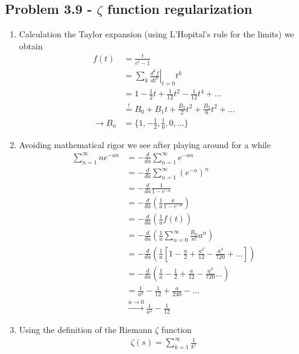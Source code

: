 \documentclass[../main.tex]{subfiles}
\begin{document}
\subsection{Problem 3.9 - \texorpdfstring{$\zeta$}{TEXT} function regularization}
\begin{enumerate}
    \item Calculation the Taylor expansion (using L'Hopital's rule for the limits) we obtain
    \begin{align}
        f(t)
        &=\frac{t}{e^t-1}\\
        &=\sum_k\left.\frac{d^kf}{dt^k}\right|_{t=0}t^k\\
        &=1-\frac{1}{2}t+\frac{1}{12}t^2-\frac{1}{12}t^4+...\\
        &\stackrel{!}{=}B_0+B_1t+\frac{B_2}{2}t^2+\frac{B_3}{6}t^2+...\\
        \rightarrow B_n&=\{1,-\frac{1}{2},\frac{1}{6},0,...\}
    \end{align}
    \item Avoiding mathematical rigor we see after playing around for a while
    \begin{align}
        \sum_{n=1}^\infty ne^{-an}
        &=-\frac{d}{da}\sum_{n=1}^\infty e^{-an}\\
        &=-\frac{d}{da}\sum_{n=1}^\infty \left(e^{-a}\right)^n\\
        &=-\frac{d}{da}\frac{1}{1-e^{-a}}\\
        &=-\frac{d}{da}\left(\frac{1}{a}\frac{a}{1-e^{-a}}\right)\\
        &=-\frac{d}{da}\left(\frac{1}{a}f(t)\right)\\
        &=-\frac{d}{da}\left(\frac{1}{a}\sum_{n=0}^\infty\frac{B_n}{n!}a^n\right)\\
        &=-\frac{d}{da}\left(\frac{1}{a}\left[1-\frac{a}{2}+\frac{a^2}{12}-\frac{a^4}{720}+...\right]\right)\\
        &=-\frac{d}{da}\left(\frac{1}{a}-\frac{1}{2}+\frac{a}{12}-\frac{a^3}{720}...\right)\\
        &=\frac{1}{a^2}-\frac{1}{12}+\frac{a}{240}-...\\
        &\stackrel{a\rightarrow0}{\rightarrow}\frac{1}{a^2}-\frac{1}{12}
    \end{align}
    \item Using the definition of the Riemann $\zeta$ function 
    \begin{align}
        \zeta(s)=\sum_{k=1}^\infty \frac{1}{k^s}
    \end{align}
\end{enumerate}
\end{document}
